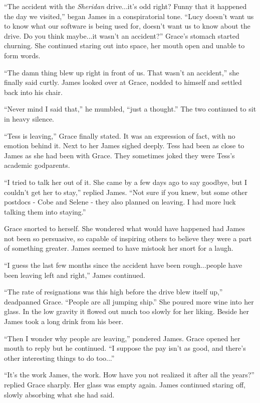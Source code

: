 \documentclass[openany, 12pt]{book} %
\begin{document}
``The accident with the \textit{Sheridan} drive...it's odd right? Funny that it happened the day we visited,'' began James in a conspiratorial tone. ``Lucy doesn't want us to know what our software is being used for, doesn't want us to know about the drive. Do you think maybe...it wasn't an accident?'' Grace's stomach started churning. She continued staring out into space, her mouth open and unable to form words. 

``The damn thing blew up right in front of us. That wasn't an accident,'' she finally said curtly. James looked over at Grace, nodded to himself and settled back into his chair.

``Never mind I said that,'' he mumbled, ``just a thought.'' The two continued to sit in heavy silence.

``Tess is leaving,'' Grace finally stated. It was an expression of fact, with no emotion behind it. Next to her James sighed deeply. Tess had been as close to James as she had been with Grace. They sometimes joked they were Tess's academic godparents.

``I tried to talk her out of it. She came by a few days ago to say goodbye, but I couldn't get her to stay,'' replied James. ``Not sure if you knew, but some other postdocs - Cobe and Selene - they also planned on leaving. I had more luck talking them into staying.''

Grace snorted to herself. She wondered what would have happened had James not been so persuasive, so capable of inspiring others to believe they were a part of something greater. James seemed to have mistook her snort for a laugh.

``I guess the last few months since the accident have been rough...people have been leaving left and right,'' James continued.

``The rate of resignations was this high before the drive blew itself up,'' deadpanned Grace. ``People are all jumping ship.'' She poured more wine into her glass. In the low gravity it flowed out much too slowly for her liking. Beside her James took a long drink from his beer.

``Then I wonder why people are leaving,'' pondered James. Grace opened her mouth to reply but he continued. ``I suppose the pay isn't as good, and there's other interesting things to do too...''

``It's the work James, the work. How have you not realized it after all the years?'' replied Grace sharply. Her glass was empty again. James continued staring off, slowly absorbing what she had said.
\end{document}
